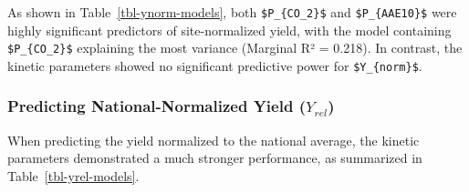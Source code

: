 \documentclass[
  a4paper,
]{article}
\begin{document}
As shown in Table~\ref{tbl-ynorm-models}, both \texttt{\$P\_\{CO\_2\}\$}
and \texttt{\$P\_\{AAE10\}\$} were highly significant predictors of
site-normalized yield, with the model containing
\texttt{\$P\_\{CO\_2\}\$} explaining the most variance (Marginal R² =
0.218). In contrast, the kinetic parameters showed no significant
predictive power for \texttt{\$Y\_\{norm\}\$}.

\subsubsection{\texorpdfstring{Predicting National-Normalized Yield
(\(Y_{rel}\))}{Predicting National-Normalized Yield (Y\_\{rel\})}}\label{sec-yrel}

When predicting the yield normalized to the national average, the
kinetic parameters demonstrated a much stronger performance, as
summarized in Table~\ref{tbl-yrel-models}.
\end{document}
